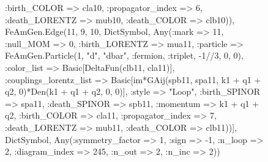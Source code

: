 \documentclass{revtex4}
\begin{document}
\begin{figure}[!htb]
\begin{center}
{:birth_COLOR => cla10, :propagator_index => 6, :death_LORENTZ => mub10, :death_COLOR => clb10)), FeAmGen.Edge(11, 9, 10, Dict{Symbol, Any}(:mark => 11, :null_MOM => 0, :birth_LORENTZ => mua11, :particle => FeAmGen.Particle(1, "d", "dbar", :fermion, :triplet, -1//3, 0, 0), :color_list => Basic[DeltaFun(clb11, cla11)], :couplings_lorentz_list => Basic[im*GAij(spb11, spa11, k1 + q1 + q2, 0)*Den(k1 + q1 + q2, 0, 0)], :style => "Loop", :birth_SPINOR => spa11, :death_SPINOR => spb11, :momentum => k1 + q1 + q2, :birth_COLOR => cla11, :propagator_index => 7, :death_LORENTZ => mub11, :death_COLOR => clb11))], Dict{Symbol, Any}(:symmetry_factor => 1, :sign => -1, :n_loop => 2, :diagram_index => 245, :n_out => 2, :n_inc => 2)) 
}
\end{center}
\end{figure}
\end{document}

